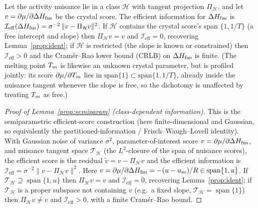 \begin{lemma}\label{prop:semiparam}
Let the activity nuisance lie in a class $\mathcal H$ with tangent projection
$\Pi_{\mathcal H}$, and let $v=\partial\mu/\partial\Delta H_{\mathrm{fus}}$ be the crystal score.
The efficient information for $\Delta H_{\mathrm{fus}}$ is
$\mathcal I_{\mathrm{eff}}(\Delta H_{\mathrm{fus}})=\sigma^{-2}\,\lVert v-\Pi_{\mathcal H}v\rVert^2$.
If $\mathcal H$ contains the crystal score's span $\{1,1/T\}$ (a free intercept and slope) then
$\Pi_{\mathcal H}v=v$ and $\mathcal I_{\mathrm{eff}}=0$, recovering
Lemma~\ref{prop:ident}; if $\mathcal H$ is restricted (the slope is known or
constrained) then $\mathcal I_{\mathrm{eff}}>0$ and the Cram\'er--Rao lower bound (CRLB) on
$\Delta H_{\mathrm{fus}}$ is finite. (The melting point $T_m$ is likewise an unknown crystal parameter, but is
profiled jointly: its score $\partial\mu/\partial T_m$ lies in $\mathrm{span}\{1\}\subset
\mathrm{span}\{1,1/T\}$, already inside the nuisance tangent whenever the slope is free, so the
dichotomy is unaffected by treating $T_m$ as free.)
\end{lemma}
\begin{proof}[Proof of Lemma~\ref{prop:semiparam} (class-dependent information)]
\sloppy{} 
This is the semiparametric efficient-score construction \cite{vandervaart1998}
(here finite-dimensional and Gaussian, so equivalently the partitioned-information /
Frisch--Waugh--Lovell identity). With
Gaussian noise of variance $\sigma^2$, parameter-of-interest score
$v=\partial\mu/\partial\Delta H_{\mathrm{fus}}$, and nuisance tangent space $\mathcal T_{\mathcal H}$
(the $L^2$-closure of the span of nuisance scores), the efficient score is the
residual $\tilde v=v-\Pi_{\mathcal H}v$ and the efficient information is
$\mathcal I_{\mathrm{eff}}=\sigma^{-2}\lVert v-\Pi_{\mathcal H}v\rVert^2$. Here
$v=\partial\mu/\partial\Delta H_{\mathrm{fus}}=-(u-u_m)/R\in\operatorname{span}\{1,u\}$. If
$\mathcal T_{\mathcal H}\supseteq\operatorname{span}\{1,u\}$ then $\Pi_{\mathcal H}v=v$
and $\mathcal I_{\mathrm{eff}}=0$, recovering Lemma~\ref{prop:ident}; if
$\mathcal T_{\mathcal H}$ is a proper subspace not containing $v$ (e.g.\ a fixed
slope, $\mathcal T_{\mathcal H}=\operatorname{span}\{1\}$) then
$\Pi_{\mathcal H}v\neq v$ and $\mathcal I_{\mathrm{eff}}>0$, with a finite
Cram\'er--Rao bound.
\end{proof}

